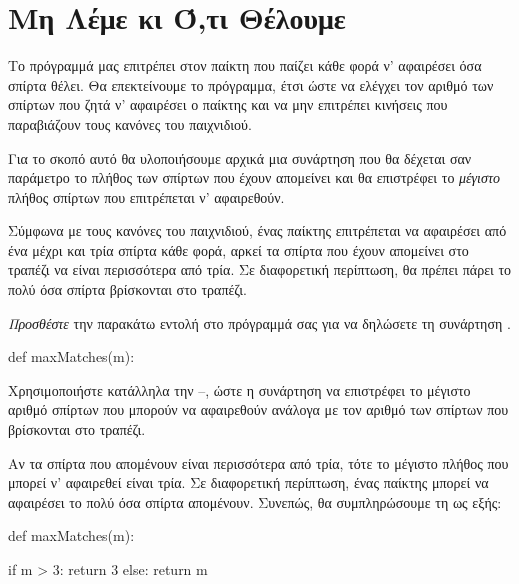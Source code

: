 \documentclass[a4paper,11pt,oneside]{book}
\begin{document}
\section{Μη Λέμε κι Ό,τι Θέλουμε}

Το πρόγραμμά μας επιτρέπει στον παίκτη που παίζει κάθε φορά ν' αφαιρέσει όσα σπίρτα θέλει. Θα επεκτείνουμε το πρόγραμμα, έτσι ώστε να ελέγχει τον αριθμό των σπίρτων που ζητά ν' αφαιρέσει ο παίκτης και να μην επιτρέπει κινήσεις που παραβιάζουν τους κανόνες του παιχνιδιού. 

\begin{step}
\label{step:check-start}
Για το σκοπό αυτό θα υλοποιήσουμε αρχικά μια συνάρτηση που θα δέχεται σαν παράμετρο το πλήθος  των σπίρτων που έχουν απομείνει και θα επιστρέφει το \emph{μέγιστο} πλήθος σπίρτων που επιτρέπεται ν' αφαιρεθούν. 

Σύμφωνα με τους κανόνες του παιχνιδιού, ένας παίκτης επιτρέπεται να αφαιρέσει από ένα μέχρι και τρία σπίρτα κάθε φορά, αρκεί τα σπίρτα που έχουν απομείνει στο τραπέζι να είναι περισσότερα από τρία. Σε διαφορετική περίπτωση, θα πρέπει πάρει το πολύ όσα σπίρτα βρίσκονται στο τραπέζι.

\emph{Προσθέστε} την παρακάτω εντολή στο πρόγραμμά σας για να δηλώσετε τη συνάρτηση .

\begin{pynew}
def maxMatches(m):
\end{pynew}

Χρησιμοποιήστε κατάλληλα την --, ώστε η συνάρτηση να επιστρέφει το μέγιστο αριθμό σπίρτων που μπορούν να αφαιρεθούν ανάλογα με τον αριθμό των σπίρτων  που βρίσκονται στο τραπέζι. 

\begin{answer}
Αν τα σπίρτα  που απομένουν είναι περισσότερα από τρία, τότε το μέγιστο πλήθος που μπορεί ν' αφαιρεθεί είναι τρία. Σε διαφορετική περίπτωση, ένας παίκτης μπορεί να αφαιρέσει το πολύ όσα σπίρτα απομένουν. Συνεπώς, θα συμπληρώσουμε τη  ως εξής: 

\begin{pyplain}
def maxMatches(m):
\end{pyplain}
\begin{pynew}
    if m > 3:
        return 3
    else:
        return m
\end{pynew}
\end{answer}
\end{step}
\end{document}
